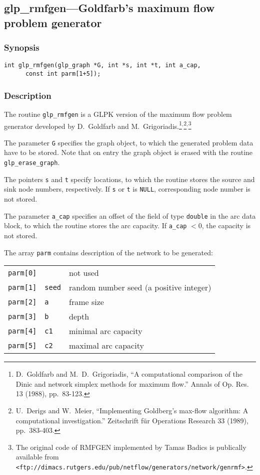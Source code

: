 \documentclass[dvipdfm,11pt]{report}
\begin{document}
\newpage

\subsection{glp\_rmfgen---Goldfarb's maximum flow problem generator}

\subsubsection*{Synopsis}

\begin{verbatim}
int glp_rmfgen(glp_graph *G, int *s, int *t, int a_cap,
      const int parm[1+5]);
\end{verbatim}

\subsubsection*{Description}

The routine \verb|glp_rmfgen| is a GLPK version of the maximum flow
problem generator developed by D.~Goldfarb and
M.~Grigoriadis.\footnote{D.~Goldfarb and M.~D.~Grigoriadis,
``A computational comparison of the Dinic and network simplex methods
for maximum flow.'' Annals of Op. Res. 13 (1988),
pp.~83-123.}$^{,}$\footnote{U.~Derigs and W.~Meier, ``Implementing
Goldberg's max-flow algorithm: A computational investigation.''
Zeitschrift f\"ur Operations Research 33 (1989),
pp.~383-403.}$^{,}$\footnote{The original code of RMFGEN implemented by
Tamas Badics is publically available from
{\tt <ftp://dimacs.rutgers.edu/pub/netflow/generators/network/genrmf>}.}

The parameter \verb|G| specifies the graph object, to which the
generated problem data have to be stored. Note that on entry the graph
object is erased with the routine \verb|glp_erase_graph|.

The pointers \verb|s| and \verb|t| specify locations, to which the
routine stores the source and sink node numbers, respectively. If
\verb|s| or \verb|t| is \verb|NULL|, corresponding node number is not
stored.

The parameter \verb|a_cap| specifies an offset of the field of type
\verb|double| in the arc data block, to which the routine stores the arc
capacity. If \verb|a_cap| $<0$, the capacity is not stored.

The array \verb|parm| contains description of the network to be
generated:

\begin{tabular}{@{}lll@{}}
\verb|parm[0]|&           &not used\\
\verb|parm[1]|&\verb|seed|&random number seed (a positive integer)\\
\verb|parm[2]|&\verb|a   |&frame size\\
\verb|parm[3]|&\verb|b   |&depth\\
\verb|parm[4]|&\verb|c1  |&minimal arc capacity\\
\verb|parm[5]|&\verb|c2  |&maximal arc capacity\\
\end{tabular}
\end{document}
